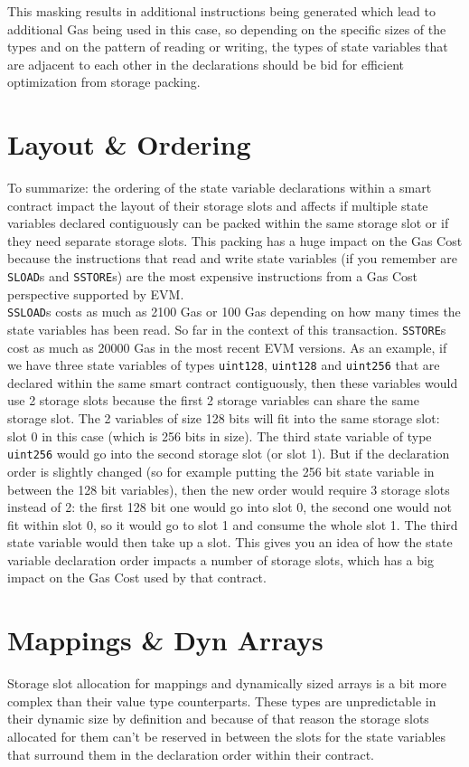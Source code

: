 This masking results in additional instructions being generated which lead to additional Gas being used in this case, so depending on the specific sizes of the types and on the pattern of reading or writing, the types of state variables that are adjacent to each other in the declarations should be bid for efficient optimization from storage packing.

\section{Layout \& Ordering}
To summarize: the ordering of the state variable declarations within a smart contract impact the layout of their storage slots and affects if multiple state variables declared contiguously can be packed within the same storage slot or if they need separate storage slots. This packing has a huge impact on the Gas Cost because the instructions that read and write state variables (if you remember are \verb|SLOAD|s and \verb|SSTORE|s) are the most expensive instructions from a Gas Cost perspective supported by EVM.\\

\verb|SSLOAD|s costs as much as 2100 Gas or 100 Gas depending on how many times the state variables has been read. So far in the context of this transaction. \verb|SSTORE|s cost as much as 20000 Gas in the most recent EVM versions. As an example, if we have three state variables of types \verb|uint128|, \verb|uint128| and \verb|uint256| that are declared within the same smart contract contiguously, then these variables would use 2 storage slots because the first 2 storage variables can share the same storage slot. The 2 variables of size 128 bits will fit into the same storage slot: slot 0 in this case (which is 256 bits in size). The third state variable of type \verb|uint256| would go into the second storage slot (or slot 1). But if the declaration order is slightly changed (so for example putting the 256 bit state variable in between the 128 bit variables), then the new order would require 3 storage slots instead of 2: the first 128 bit one would go into slot 0, the second one would not fit within slot 0, so it would go to slot 1 and consume the whole slot 1. The third state variable would then take up a slot. This gives you an idea of how the state variable declaration order impacts a number of storage slots, which has a big impact on the Gas Cost used by that contract.

\section{Mappings \& Dyn Arrays}
Storage slot allocation for mappings and dynamically sized arrays is a bit more complex than their value type counterparts. These types are unpredictable in their dynamic size by definition and because of that reason the storage slots allocated for them can't be reserved in between the slots for the state variables that surround them in the declaration order within their contract.\\

